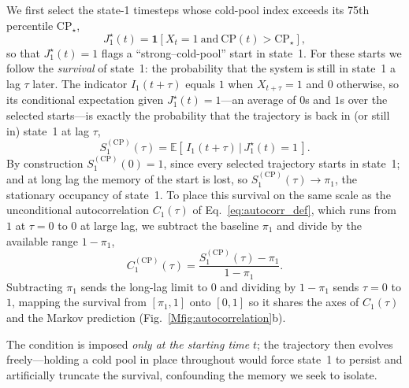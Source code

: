 \documentclass[
    aps,
    prl,
    reprint,
    superscriptaddress,
    amsmath,amssymb,
    nofootinbib,
    floatfix
]{revtex4-2}
\begin{document}
We first select the state-1 timesteps whose cold-pool index exceeds its 75th percentile $\mathrm{CP}_\star$,
\begin{equation}
J_1^\star(t)=\mathbf{1}\!\left[X_t=1\ \text{and}\ \mathrm{CP}(t)>\mathrm{CP}_\star\right],
\end{equation}
so that $J_1^\star(t)=1$ flags a ``strong--cold-pool'' start in state~1. For these starts we follow the \emph{survival} of state~1: the probability that the system is still in state~1 a lag $\tau$ later. The indicator $I_1(t+\tau)$ equals $1$ when $X_{t+\tau}=1$ and $0$ otherwise, so its conditional expectation given $J_1^\star(t)=1$---an average of $0$s and $1$s over the selected starts---is exactly the probability that the trajectory is back in (or still in) state~1 at lag $\tau$,
\begin{equation}
S^{(\mathrm{CP})}_1(\tau)=\mathbb{E}\!\left[\,I_1(t+\tau)\,\big|\,J_1^\star(t)=1\,\right].
\end{equation}
By construction $S^{(\mathrm{CP})}_1(0)=1$, since every selected trajectory starts in state~1; and at long lag the memory of the start is lost, so $S^{(\mathrm{CP})}_1(\tau)\to\pi_1$, the stationary occupancy of state~1. To place this survival on the same scale as the unconditional autocorrelation $C_1(\tau)$ of Eq.~\eqref{eq:autocorr_def}, which runs from $1$ at $\tau=0$ to $0$ at large lag, we subtract the baseline $\pi_1$ and divide by the available range $1-\pi_1$,
\begin{equation}
C^{(\mathrm{CP})}_1(\tau)=\frac{S^{(\mathrm{CP})}_1(\tau)-\pi_1}{1-\pi_1}.
\end{equation}
Subtracting $\pi_1$ sends the long-lag limit to $0$ and dividing by $1-\pi_1$ sends $\tau=0$ to $1$, mapping the survival from $[\pi_1,1]$ onto $[0,1]$ so it shares the axes of $C_1(\tau)$ and the Markov prediction (Fig.~\ref{Mfig:autocorrelation}b).

The condition is imposed \emph{only at the starting time} $t$; the trajectory then evolves freely---holding a cold pool in place throughout would force state~1 to persist and artificially truncate the survival, confounding the memory we seek to isolate.



\end{document}

